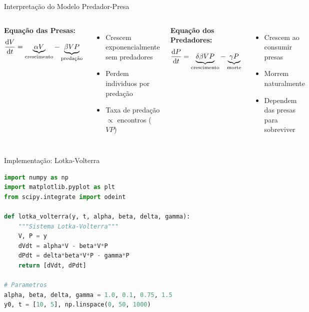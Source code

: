 \begin{frame}[shrink=10]{Interpretação do Modelo Predador-Presa}
\begin{columns}
\textbf{Equação das Presas:}
\begin{equation*}
\frac{\mathrm{d} V}{\mathrm{d} t} = \underbrace{\alpha V}_{\text{crescimento}} - \underbrace{\beta V P}_{\text{predação}}
\end{equation*}

\begin{itemize}
    \item Crescem exponencialmente sem predadores
    \item Perdem individuos por predação
    \item Taxa de predação $\propto$ encontros ($VP$)
\end{itemize}

\textbf{Equação dos Predadores:}
\begin{equation*}
\frac{\mathrm{d} P}{\mathrm{d} t} = \underbrace{\delta \beta V P}_{\text{crescimento}} - \underbrace{\gamma P}_{\text{morte}}
\end{equation*}

\begin{itemize}
    \item Crescem ao consumir presas
    \item Morrem naturalmente
    \item Dependem das presas para sobreviver
\end{itemize}
\end{columns}

\vspace{0.3cm}

\end{frame}

\begin{frame}{Implementação: Lotka-Volterra}
\begin{lstlisting}[language=Python, caption=Sistema predador-presa, basicstyle=\ttfamily\footnotesize]
import numpy as np
import matplotlib.pyplot as plt
from scipy.integrate import odeint

def lotka_volterra(y, t, alpha, beta, delta, gamma):
    """Sistema Lotka-Volterra"""
    V, P = y
    dVdt = alpha*V - beta*V*P
    dPdt = delta*beta*V*P - gamma*P
    return [dVdt, dPdt]

# Parametros
alpha, beta, delta, gamma = 1.0, 0.1, 0.75, 1.5
y0, t = [10, 5], np.linspace(0, 50, 1000)
\end{lstlisting}
\end{frame}

